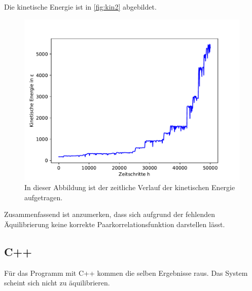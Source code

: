 Die kinetische Energie ist in \autoref{fig:kin2} abgebildet.
\begin{figure}[H]
    \centering
    \includegraphics[scale=0.5]{MolDyn/Big Boy/kinetic_energy.pdf}
    \caption{In dieser Abbildung ist der zeitliche Verlauf der kinetischen Energie aufgetragen.}
    \label{fig:kin2}
\end{figure}
Zusammenfassend ist anzumerken, dass sich aufgrund der fehlenden Äquilibrierung keine korrekte Paarkorrelationsfunktion darstellen lässt.
\newpage

\subsection{C++}
    Für das Programm mit C++ kommen die selben Ergebnisse raus. Das System scheint sich nicht zu äquilibrieren.